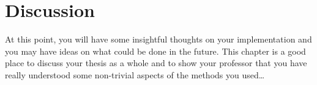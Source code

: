 
\chapter{Discussion}
\label{chapter:discussion}

At this point, you will have some insightful thoughts on your implementation
and you may have ideas on what could be done in the future. 
This chapter is a good place to discuss your thesis as a whole and to show your
professor that you have really understood some non-trivial aspects of the
methods you used\ldots

